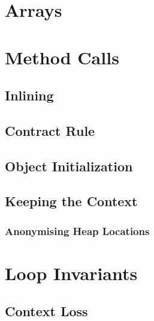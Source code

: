 \documentclass[a4paper, 11pt, accentcolor = tud3b]{tudreport}
\begin{document}
        \section{Arrays} %

        \section{Method Calls} %

            \subsection{Inlining} %

            \subsection{Contract Rule} %

            \subsection{Object Initialization} %

            \subsection{Keeping the Context} %

                \subsubsection{Anonymising Heap Locations} %

        \section{Loop Invariants} %

            \subsection{Context Loss} %
\end{document}
